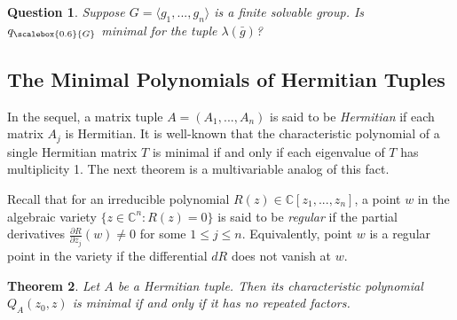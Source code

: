 \documentclass[draft, 12pt, reqno]{amsart}
\newcommand{\C}{{\mathbb C}}
\newcommand{\lb}{{\lambda}}
\numberwithin{equation}{section}
\theoremstyle{plain}
\newtheorem{theorem}{Theorem}[section]
\newtheorem{question}[theorem]{Question}
\begin{document}
\begin{question}
 Suppose $G=\langle g_1, ..., g_n\rangle$ is a finite solvable group. Is $q_{\scalebox{0.6}{G}}$ 
 minimal for the tuple $\lb(\bar{g})$? 
  \end{question}    
  
  \vspace{1mm}

\subsection{The Minimal Polynomials of Hermitian Tuples}
In the sequel, a matrix tuple $A=(A_1, ..., A_n)$ is said to be {\em Hermitian} if each matrix $A_j$ is Hermitian. It is well-known that the characteristic polynomial of a single Hermitian matrix $T$ is minimal if and only if each eigenvalue of $T$ has multiplicity 1. The next theorem is a multivariable analog of this fact.

Recall that for an irreducible polynomial $R(z)\in \C[z_1, ..., z_n]$, a point $w$ in the algebraic variety $\{z\in \C^n: R(z)=0\}$ is said to be {\em regular} if the partial derivatives $\frac{\partial R}{\partial z_j}(w)\neq 0$ for some $1\leq j\leq n$. Equivalently, point $w$ is a regular point in the variety if the differential $dR$ does not vanish at $w$.
\begin{theorem}\label{chacteristic minimal}
Let $A$ be a Hermitian tuple. Then its characteristic polynomial $Q_A(z_0,z)$ is minimal if and only if it has no repeated factors.
\end{theorem}
\end{document}
